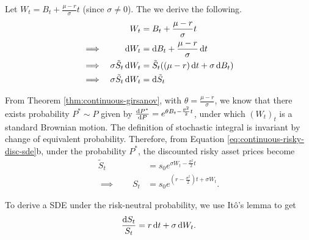 Let $ W_t = B_t + \frac{\mu - r}{\sigma} t $ (since $ \sigma \ne 0 $). The we derive the following.
\begin{subequations}
	\label{eq:continuous-risky-disc-sde}
	\begin{align}
		&&  W_t  &=  B_t + \frac{\mu - r}{\sigma} t  \\
		\implies  &&  \dif W_t  &=  \dif B_t + \frac{\mu - r}{\sigma} \dif t  \nonumber \\
		\implies  &&  \sigma \tilde{S}_t \dif W_t  &=  \tilde{S}_t ( (\mu - r) \dif t + \sigma \dif B_t )  \nonumber \\
		\implies  &&  \sigma \tilde{S}_t \dif W_t  &=  \dif \tilde{S}_t
	\end{align}
\end{subequations}

From Theorem \ref{thm:continuous-girsanov}, with $ \theta = \frac{\mu - r}{\sigma} $, we know that there exists probability $ P^* \sim P $ given by $ \frac{\dif P^*}{\dif P} = e^{ \theta B_t - \frac{\theta^2}{2} t } $,
under which $ (W_t)_t $ is a standard Brownian motion. The definition of stochastic integral is invariant by change of equivalent probability. Therefore, from Equation \ref{eq:continuous-risky-disc-sde}b, under the probability $ P^* $, the discounted risky asset prices become
\begin{subequations}
	\begin{align}
		\label{eq:continous-risky}
		\tilde{S}_t  &=  s_0 e^{\sigma W_t - \frac{\sigma^2}{2} t }  \\
		\implies  \qquad  S_t  &=  s_0 e^{ ( r - \frac{\sigma^2}{2} ) t + \sigma W_t }.
	\end{align}	
\end{subequations}

To derive a SDE under the risk-neutral probability, we use Itô's lemma to get
\begin{equation}
	\label{eq:continuous-risky-sde-risk-neutral}
	\frac{\dif S_t}{S_t} = r \dif t + \sigma \dif W_t .
\end{equation}


